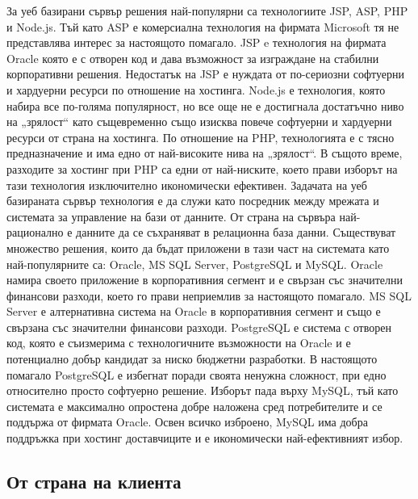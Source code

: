 За уеб базирани сървър решения най-популярни са технологиите JSP, ASP, PHP и Node.js. Тъй като ASP е комерсиална технология на фирмата Microsoft тя не представлява интерес за настоящото помагало. JSP e технология на фирмата Oracle която е с отворен код и дава възможност за изграждане на стабилни корпоративни решения. Недостатък на JSP е нуждата от по-сериозни софтуерни и хардуерни ресурси по отношение на хостинга. Node.js е технология, която набира все по-голяма популярност, но все още не е достигнала достатъчно ниво на „зрялост“ като същевременно също изисква повече софтуерни и хардуерни ресурси от страна на хостинга. По отношение на PHP, технологията е с тясно предназначение и има едно от най-високите нива на „зрялост“. В същото време, разходите за хостинг при PHP са едни от най-ниските, което прави изборът на тази технология изключително икономически ефективен. Задачата на уеб базираната сървър технология е да служи като посредник между мрежата и системата за управление на бази от данните. От страна на сървъра най-рационално е данните да се съхраняват в релационна база данни. Съществуват множество решения, които да бъдат приложени в тази част на системата като най-популярните са: Oracle, MS SQL Server, PostgreSQL и MySQL. Oracle намира своето приложение в корпоративния сегмент и е свързан със значителни финансови разходи, което го прави неприемлив за настоящото помагало. MS SQL Server е алтернативна система  на Oracle в корпоративния сегмент и също е свързана със значителни финансови разходи. PostgreSQL е система с отворен код, която е съизмерима с технологичните възможности на Oracle и е потенциално добър кандидат за ниско бюджетни разработки. В настоящото помагало PostgreSQL е избегнат поради своята ненужна сложност, при едно относително просто софтуерно решение. Изборът пада върху MySQL, тъй като системата е максимално опростена добре наложена сред потребителите и се поддържа от фирмата Oracle. Освен всичко изброено, MySQL има добра поддръжка при хостинг доставчиците и е икономически най-ефективният избор. 

\subsection{От страна на клиента}

